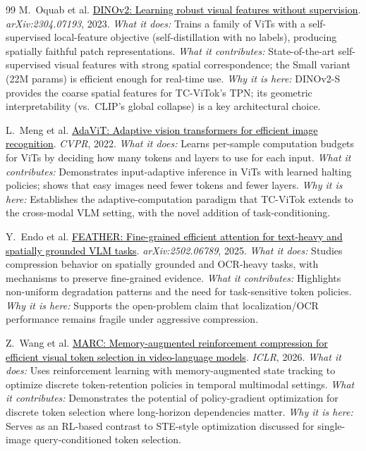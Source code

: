 \documentclass[11pt,twocolumn]{article}
\newcommand{\paperhref}[2]{\href{#1}{\textcolor{black}{#2}}}
\begin{document}
\begin{thebibliography}{99}
M.~Oquab et al.
\newblock \paperhref{https://arxiv.org/abs/2304.07193}{DINOv2: Learning robust visual features without supervision}.
\newblock \textit{arXiv:2304.07193}, 2023.
\newblock \textit{What it does:} Trains a family of ViTs with a self-supervised local-feature objective (self-distillation with no labels), producing spatially faithful patch representations.
\newblock \textit{What it contributes:} State-of-the-art self-supervised visual features with strong spatial correspondence; the Small variant (22M params) is efficient enough for real-time use.
\newblock \textit{Why it is here:} DINOv2-S provides the coarse spatial features for TC-ViTok's TPN; its geometric interpretability (vs.\ CLIP's global collapse) is a key architectural choice.

L.~Meng et al.
\newblock \paperhref{https://openaccess.thecvf.com/content/CVPR2022/papers/Meng_AdaViT_Adaptive_Vision_Transformers_for_Efficient_Image_Recognition_CVPR_2022_paper.pdf}{AdaViT: Adaptive vision transformers for efficient image recognition}.
\newblock \textit{CVPR}, 2022.
\newblock \textit{What it does:} Learns per-sample computation budgets for ViTs by deciding how many tokens and layers to use for each input.
\newblock \textit{What it contributes:} Demonstrates input-adaptive inference in ViTs with learned halting policies; shows that easy images need fewer tokens and fewer layers.
\newblock \textit{Why it is here:} Establishes the adaptive-computation paradigm that TC-ViTok extends to the cross-modal VLM setting, with the novel addition of task-conditioning.

Y.~Endo et al.
\newblock \paperhref{https://arxiv.org/abs/2502.06789}{FEATHER: Fine-grained efficient attention for text-heavy and spatially grounded VLM tasks}.
\newblock \textit{arXiv:2502.06789}, 2025.
\newblock \textit{What it does:} Studies compression behavior on spatially grounded and OCR-heavy tasks, with mechanisms to preserve fine-grained evidence.
\newblock \textit{What it contributes:} Highlights non-uniform degradation patterns and the need for task-sensitive token policies.
\newblock \textit{Why it is here:} Supports the open-problem claim that localization/OCR performance remains fragile under aggressive compression.

Z.~Wang et al.
\newblock \paperhref{https://openreview.net/forum?id=7k8OtrGxBs}{MARC: Memory-augmented reinforcement compression for efficient visual token selection in video-language models}.
\newblock \textit{ICLR}, 2026.
\newblock \textit{What it does:} Uses reinforcement learning with memory-augmented state tracking to optimize discrete token-retention policies in temporal multimodal settings.
\newblock \textit{What it contributes:} Demonstrates the potential of policy-gradient optimization for discrete token selection where long-horizon dependencies matter.
\newblock \textit{Why it is here:} Serves as an RL-based contrast to STE-style optimization discussed for single-image query-conditioned token selection.

\end{thebibliography}
\end{document}
